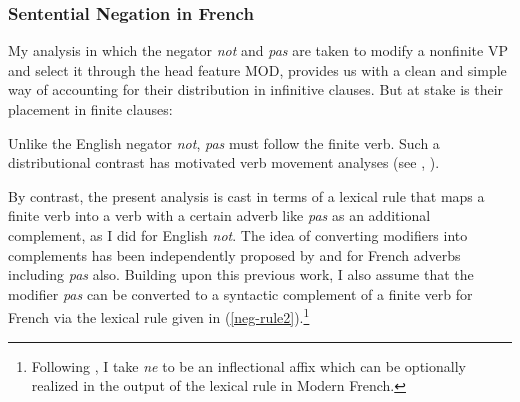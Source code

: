 \documentclass[output=paper]{langsci/langscibook}
\begin{document}
\subsubsection{Sentential Negation in French}


My analysis in which the negator \emph{not} and \emph{pas} are taken
to modify a nonfinite VP and select it through the head feature
MOD, provides us with a clean and simple way of accounting for
their distribution in infinitive clauses. But at stake is
their placement in finite clauses:

\be
\ex \begin{xlist}
\end{xlist}
\ee

\be
\ex \begin{xlist}
\end{xlist}
\ee



\noindent
Unlike the English negator \emph{not}, \emph{pas} must follow the
finite verb. Such a distributional contrast has motivated verb
movement analyses (see \citet{Pollock:89}, \citet{Zanuttini:01}).

By contrast, the present analysis is cast
in terms of a lexical rule that maps a finite verb into a verb
with a certain adverb like \emph{pas} as an additional complement, as
I did for English \emph{not}.  The idea of converting modifiers into
complements
has been independently proposed by \citet{Miller:91} and
\citet{AG:94} for French adverbs including
\emph{pas} also.  Building upon this
previous work, I also assume that the modifier \emph{pas} can
be converted to a syntactic complement of a
finite verb for French via the lexical rule given
in (\ref{neg-rule2}).\footnote{Following \citet{Miller:91}, I take {\it ne} to
be an inflectional affix which can be optionally realized
in the output of the lexical rule in Modern French.}
\end{document}
